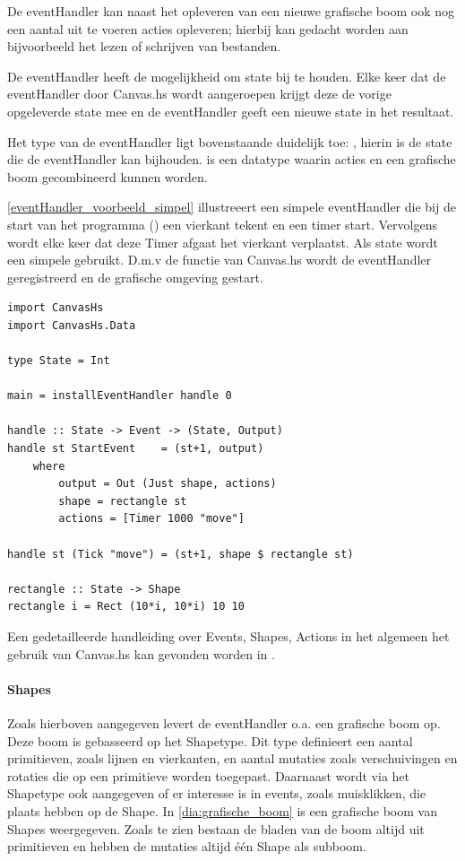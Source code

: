 De eventHandler kan naast het opleveren van een nieuwe grafische boom ook nog een aantal uit te voeren acties opleveren; hierbij kan gedacht worden aan bijvoorbeeld het lezen of schrijven van bestanden. 

De eventHandler heeft de mogelijkheid om state bij te houden. Elke keer dat de eventHandler door Canvas.hs wordt aangeroepen krijgt deze de vorige opgeleverde state mee en de eventHandler geeft een nieuwe state in het resultaat. 

Het type van de eventHandler ligt bovenstaande duidelijk toe: , hierin is  de state die de eventHandler kan bijhouden.  is een datatype waarin acties en een grafische boom gecombineerd kunnen worden.

\autoref{eventHandler_voorbeeld_simpel} illustreeert een simpele eventHandler die bij de start van het programma () een vierkant tekent en een timer start. Vervolgens wordt elke keer dat deze Timer afgaat het vierkant verplaatst. Als state wordt een simpele  gebruikt. D.m.v de  functie van Canvas.hs wordt de eventHandler geregistreerd en de grafische omgeving gestart.

\begin{lstlisting}[caption=Voorbeeld van een simpele eventHandler, label=eventHandler_voorbeeld_simpel]
import CanvasHs
import CanvasHs.Data

type State = Int

main = installEventHandler handle 0

handle :: State -> Event -> (State, Output)
handle st StartEvent    = (st+1, output)
	where 
		output = Out (Just shape, actions)
		shape = rectangle st
		actions = [Timer 1000 "move"]
		
handle st (Tick "move") = (st+1, shape $ rectangle st)
		
rectangle :: State -> Shape
rectangle i = Rect (10*i, 10*i) 10 10
\end{lstlisting}

Een gedetailleerde handleiding over Events, Shapes, Actions in het algemeen het gebruik van Canvas.hs kan gevonden worden in .

\paragraph{Shapes}
\label{par:globaal_shapes}
Zoals hierboven aangegeven levert de eventHandler o.a. een grafische boom op. Deze boom is gebasseerd op het Shapetype. Dit type definieert een aantal primitieven, zoals lijnen en vierkanten, en aantal mutaties zoals verschuivingen en rotaties die op een primitieve worden toegepast. Daarnaast wordt via het Shapetype ook aangegeven of er interesse is in events, zoals muisklikken, die plaats hebben op de Shape. In \autoref{dia:grafische_boom} is een grafische boom van Shapes weergegeven. Zoals te zien bestaan de bladen van de boom altijd uit primitieven en hebben de mutaties altijd één Shape als subboom.

